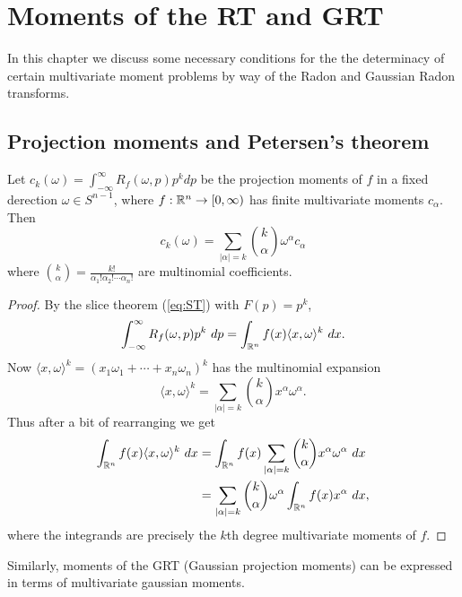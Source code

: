 \chapter{Moments of the RT and GRT}{}
\label{chap:RTmoments}

In this chapter we discuss some necessary conditions for the the determinacy of certain multivariate moment problems by way of the Radon and Gaussian Radon transforms.

\section{Projection moments and Petersen's theorem}


\begin{proposition}
  Let $c_k (\omega) = \int_{-\infty}^\infty R_f(\omega, p) p^k dp$ be the projection moments of $f$ in a fixed  derection $\omega \in S^{n-1}$, where $f : \mathbb{R}^n \to [0, \infty)$ has finite multivariate moments $c_\alpha$. Then
  \[
      c_k(\omega) = \sum_{|\alpha| = k}\binom{k}{\alpha} \omega^\alpha c_\alpha
  \]
  where $\binom{k}{\alpha} = \frac{k!}{\alpha_1! \alpha_2! \cdots \alpha_n!}$ are multinomial coefficients.
\end{proposition}

\begin{proof}
  By the slice theorem (\ref{eq:ST}) with $F(p) = p^k$,
  \[
    \int_{-\infty}^\infty R_f(\omega, p) p^k ~dp 
    = \int_{\mathbb{R}^n} f(x) \langle x, \omega \rangle^k ~dx.
  \]
  Now $\langle x, \omega \rangle^k = {(x_1 \omega_1 + \cdots + x_n \omega_n)}^k$ has the multinomial expansion
  \[
    \langle x, \omega \rangle^k = \sum_{|\alpha| = k}\binom{k}{\alpha} x^\alpha\omega^\alpha.
  \]
  Thus after a bit of rearranging we get
  \begin{align*}
    \int_{\mathbb{R}^n} f(x) \langle x, \omega \rangle^k ~dx
    &= \int_{\mathbb{R}^n} f(x) \sum_{|\alpha| = k}\binom{k}{\alpha} x^\alpha \omega^\alpha ~dx \\
    &= \sum_{|\alpha| = k}\binom{k}{\alpha} \omega^\alpha \int_{\mathbb{R}^n} f(x) x^\alpha ~dx,
  \end{align*}
  where the integrands are precisely the $k$th degree multivariate moments of $f$.
\end{proof}

Similarly, moments of the GRT (Gaussian projection moments) can be expressed in terms of multivariate gaussian moments.

